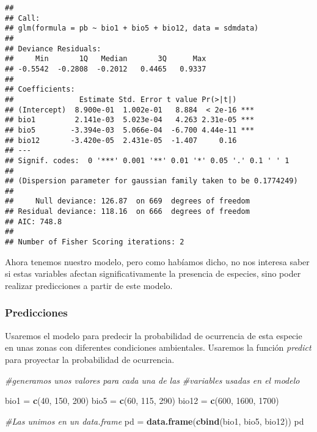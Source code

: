 \documentclass[]{article}
\newenvironment{Shaded}{\begin{snugshade}}{\end{snugshade}}
\newcommand{\KeywordTok}[1]{\textcolor[rgb]{0.13,0.29,0.53}{\textbf{{#1}}}}
\newcommand{\DecValTok}[1]{\textcolor[rgb]{0.00,0.00,0.81}{{#1}}}
\newcommand{\StringTok}[1]{\textcolor[rgb]{0.31,0.60,0.02}{{#1}}}
\newcommand{\CommentTok}[1]{\textcolor[rgb]{0.56,0.35,0.01}{\textit{{#1}}}}
\newcommand{\NormalTok}[1]{{#1}}
\begin{document}
\begin{verbatim}
## 
## Call:
## glm(formula = pb ~ bio1 + bio5 + bio12, data = sdmdata)
## 
## Deviance Residuals: 
##     Min       1Q   Median       3Q      Max  
## -0.5542  -0.2808  -0.2012   0.4465   0.9337  
## 
## Coefficients:
##               Estimate Std. Error t value Pr(>|t|)    
## (Intercept)  8.900e-01  1.002e-01   8.884  < 2e-16 ***
## bio1         2.141e-03  5.023e-04   4.263 2.31e-05 ***
## bio5        -3.394e-03  5.066e-04  -6.700 4.44e-11 ***
## bio12       -3.420e-05  2.431e-05  -1.407     0.16    
## ---
## Signif. codes:  0 '***' 0.001 '**' 0.01 '*' 0.05 '.' 0.1 ' ' 1
## 
## (Dispersion parameter for gaussian family taken to be 0.1774249)
## 
##     Null deviance: 126.87  on 669  degrees of freedom
## Residual deviance: 118.16  on 666  degrees of freedom
## AIC: 748.8
## 
## Number of Fisher Scoring iterations: 2
\end{verbatim}

Ahora tenemos nuestro modelo, pero como habíamos dicho, no nos interesa
saber si estas variables afectan significativamente la presencia de
especies, sino poder realizar predicciones a partir de este modelo.

\subsubsection{Predicciones}\label{predicciones}

Usaremos el modelo para predecir la probabilidad de ocurrencia de esta
especie en unas zonas con diferentes condiciones ambientales. Usaremos
la función \emph{predict} para proyectar la probabilidad de ocurrencia.

\begin{Shaded}
\begin{Highlighting}[]
\CommentTok{#generamos unos valores para cada una de las}
\CommentTok{#variables usadas en el modelo}

\NormalTok{bio1 =}\StringTok{ }\KeywordTok{c}\NormalTok{(}\DecValTok{40}\NormalTok{, }\DecValTok{150}\NormalTok{, }\DecValTok{200}\NormalTok{)}
\NormalTok{bio5 =}\StringTok{ }\KeywordTok{c}\NormalTok{(}\DecValTok{60}\NormalTok{, }\DecValTok{115}\NormalTok{, }\DecValTok{290}\NormalTok{)}
\NormalTok{bio12 =}\StringTok{ }\KeywordTok{c}\NormalTok{(}\DecValTok{600}\NormalTok{, }\DecValTok{1600}\NormalTok{, }\DecValTok{1700}\NormalTok{)}

\CommentTok{#Las unimos en un data.frame}
\NormalTok{pd =}\StringTok{ }\KeywordTok{data.frame}\NormalTok{(}\KeywordTok{cbind}\NormalTok{(bio1, bio5, bio12))}
\NormalTok{pd}
\end{Highlighting}
\end{Shaded}
\end{document}
